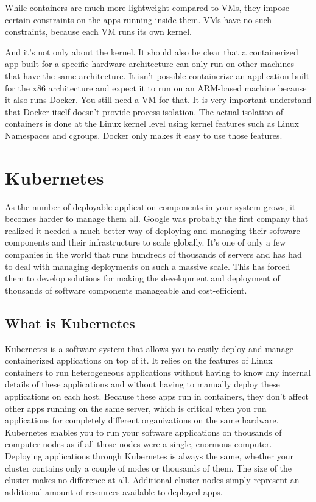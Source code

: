 While containers are much more lightweight compared to VMs, they impose certain constraints on the apps running inside them. VMs have no such constraints, because each VM runs its own kernel.

And it’s not only about the kernel. It should also be clear that a containerized app built for a specific hardware architecture can only run on other machines that have the same architecture. It isn't possible containerize an application built for the x86 architecture and expect it to run on an ARM-based machine because it also runs Docker. You still need a VM for that.
It is very important understand that Docker itself doesn’t provide process isolation. The actual isolation of containers is done at the Linux kernel level using kernel features such as Linux Namespaces and cgroups. Docker only makes it easy to use those features.


\section{Kubernetes} \label{kubernetesbackground}
As the number of deployable application components in your system grows, it becomes harder to manage them all. Google was probably the first company that realized it needed a much better way of deploying and managing their software components and their infrastructure to scale globally. It’s one of only a few companies in the world that runs hundreds of thousands of servers and has had to deal with managing deployments on such a massive scale. This has forced them to develop solutions for making the development and deployment of thousands of software components manageable and cost-efficient.


\subsection{What is Kubernetes}
Kubernetes is a software system that allows you to easily deploy and manage containerized applications on top of it. It relies on the features of Linux containers to run heterogeneous applications without having to know any internal details of these applications and without having to manually deploy these applications on each host. Because these apps run in containers, they don’t affect other apps running on the same server, which is critical when you run applications for completely different organizations on the same hardware.
Kubernetes enables you to run your software applications on thousands of computer nodes as if all those nodes were a single, enormous computer.
Deploying applications through Kubernetes is always the same, whether your cluster contains only a couple of nodes or thousands of them. The size of the cluster makes no difference at all. Additional cluster nodes simply represent an additional amount of resources available to deployed apps.

